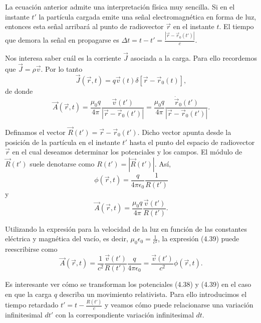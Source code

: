 \documentclass[12pt,a4paper]{book}
\begin{document}
La ecuación anterior admite una interpretación física muy sencilla. Si en el instante $t'$ la partícula cargada emite una señal electromagnética en forma de luz, entonces esta señal arribará al punto de radiovector $\vec{r}$ en el instante $t$. El tiempo que demora la señal en propagarse es $\Delta t = t - t' = \frac{|\vec{r} - \vec{r}_0(t')|}{c}$.

Nos interesa saber cuál es la corriente $\vec{J}$ asociada a la carga. Para ello recordemos que $\vec{J} = \rho\vec{v}$. Por lo tanto
\begin{equation}
\vec{J}(\vec{r}, t) = q\vec{v}(t)\delta[\vec{r} - \vec{r}_0(t)],
\end{equation}
de donde
\begin{equation}
\vec{A}(\vec{r}, t) = \frac{\mu_0 q}{4\pi}\frac{\vec{v}(t')}{|\vec{r} - \vec{r}_0(t')|} = \frac{\mu_0 q}{4\pi}\frac{\dot{\vec{r}}_0(t')}{|\vec{r} - \vec{r}_0(t')|}.
\end{equation}

Definamos el vector $\vec{R}(t') = \vec{r} - \vec{r}_0(t')$. Dicho vector apunta desde la posición de la partícula en el instante $t'$ hasta el punto del espacio de radiovector $\vec{r}$ en el cual deseamos determinar los potenciales y los campos. El módulo de $\vec{R}(t')$ suele denotarse como $R(t') = |\vec{R}(t')|$. Así,
\begin{equation}
\phi(\vec{r}, t) = \frac{q}{4\pi\epsilon_0}\frac{1}{R(t')}
\end{equation}
y
\begin{equation}
\vec{A}(\vec{r}, t) = \frac{\mu_0 q}{4\pi}\frac{\vec{v}(t')}{R(t')}.
\end{equation}

Utilizando la expresión para la velocidad de la luz en función de las constantes eléctrica y magnética del vacío, es decir, $\mu_0\epsilon_0 = \frac{1}{c^2}$, la expresión (4.39) puede reescribirse como
\begin{equation}
\vec{A}(\vec{r}, t) = \frac{1}{c^2}\frac{\vec{v}(t')}{R(t')}\frac{q}{4\pi\epsilon_0} = \frac{\vec{v}(t')}{c^2}\phi(\vec{r}, t).
\end{equation}

Es interesante ver cómo se transforman los potenciales (4.38) y (4.39) en el caso en que la carga $q$ describa un movimiento relativista. Para ello introducimos el tiempo retardado $t' = t - \frac{R(t')}{c}$ y veamos cómo puede relacionarse una variación infinitesimal $dt'$ con la correspondiente variación infinitesimal $dt$.
\end{document}
